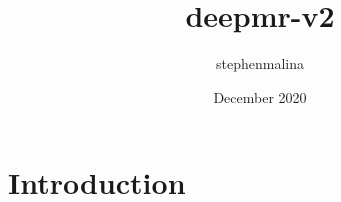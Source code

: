 \documentclass{article}
\title{deepmr-v2}
\author{stephenmalina }
\date{December 2020}
\begin{document}
\maketitle

\section{Introduction}
\end{document}
